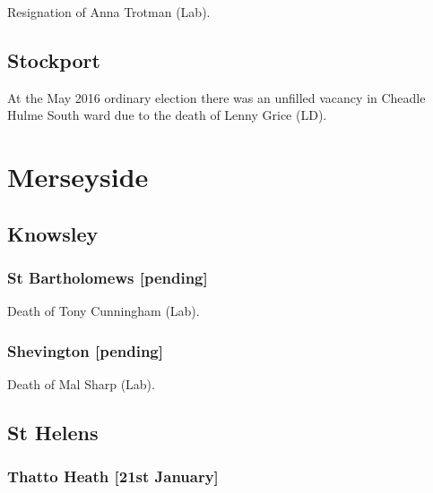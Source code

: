 \documentclass[a4paper,openany]{book}
\begin{document}
\begin{resultsiii}

Resignation of Anna Trotman (Lab).

\subsection*{Stockport}

At the May 2016 ordinary election there was an unfilled vacancy in Cheadle Hulme South ward due to the death of Lenny Grice (LD).

\section{Merseyside}

\subsection*{Knowsley}

\subsubsection*{St Bartholomews \hspace*{\fill}\nolinebreak[1]%
\enspace\hspace*{\fill}
[pending]}


Death of Tony Cunningham (Lab).

\subsubsection*{Shevington \hspace*{\fill}\nolinebreak[1]%
\enspace\hspace*{\fill}
[pending]}


Death of Mal Sharp (Lab).

\subsection*{St Helens}

\subsubsection*{Thatto Heath \hspace*{\fill}\nolinebreak[1]%
\enspace\hspace*{\fill}
[21st January]}


\end{resultsiii}
\end{document}
